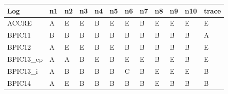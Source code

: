 \begin{tabular}{llllllllllll}
\toprule
        Log &                         n1 &                         n2 &                         n3 &                         n4 &                         n5 &                         n6 &                         n7 &                         n8 &                         n9 &                        n10 &                      trace \\
\midrule
      ACCRE & \cellcolor[HTML]{FFFFFF} A & \cellcolor[HTML]{56B4E9} E & \cellcolor[HTML]{56B4E9} E & \cellcolor[HTML]{D55E00} B & \cellcolor[HTML]{56B4E9} E & \cellcolor[HTML]{56B4E9} E & \cellcolor[HTML]{D55E00} B & \cellcolor[HTML]{56B4E9} E & \cellcolor[HTML]{56B4E9} E & \cellcolor[HTML]{56B4E9} E & \cellcolor[HTML]{56B4E9} E \\
     BPIC11 & \cellcolor[HTML]{D55E00} B & \cellcolor[HTML]{D55E00} B & \cellcolor[HTML]{D55E00} B & \cellcolor[HTML]{D55E00} B & \cellcolor[HTML]{D55E00} B & \cellcolor[HTML]{D55E00} B & \cellcolor[HTML]{D55E00} B & \cellcolor[HTML]{D55E00} B & \cellcolor[HTML]{D55E00} B & \cellcolor[HTML]{D55E00} B & \cellcolor[HTML]{FFFFFF} A \\
     BPIC12 & \cellcolor[HTML]{FFFFFF} A & \cellcolor[HTML]{56B4E9} E & \cellcolor[HTML]{56B4E9} E & \cellcolor[HTML]{D55E00} B & \cellcolor[HTML]{56B4E9} E & \cellcolor[HTML]{D55E00} B & \cellcolor[HTML]{D55E00} B & \cellcolor[HTML]{D55E00} B & \cellcolor[HTML]{D55E00} B & \cellcolor[HTML]{D55E00} B & \cellcolor[HTML]{56B4E9} E \\
 BPIC13\_cp & \cellcolor[HTML]{FFFFFF} A & \cellcolor[HTML]{FFFFFF} A & \cellcolor[HTML]{D55E00} B & \cellcolor[HTML]{56B4E9} E & \cellcolor[HTML]{D55E00} B & \cellcolor[HTML]{56B4E9} E & \cellcolor[HTML]{56B4E9} E & \cellcolor[HTML]{D55E00} B & \cellcolor[HTML]{56B4E9} E & \cellcolor[HTML]{D55E00} B & \cellcolor[HTML]{56B4E9} E \\
  BPIC13\_i & \cellcolor[HTML]{FFFFFF} A & \cellcolor[HTML]{D55E00} B & \cellcolor[HTML]{D55E00} B & \cellcolor[HTML]{D55E00} B & \cellcolor[HTML]{D55E00} B & \cellcolor[HTML]{E69F00} C & \cellcolor[HTML]{D55E00} B & \cellcolor[HTML]{56B4E9} E & \cellcolor[HTML]{56B4E9} E & \cellcolor[HTML]{56B4E9} E & \cellcolor[HTML]{D55E00} B \\
     BPIC14 & \cellcolor[HTML]{FFFFFF} A & \cellcolor[HTML]{56B4E9} E & \cellcolor[HTML]{D55E00} B & \cellcolor[HTML]{D55E00} B & \cellcolor[HTML]{D55E00} B & \cellcolor[HTML]{D55E00} B & \cellcolor[HTML]{D55E00} B & \cellcolor[HTML]{56B4E9} E & \cellcolor[HTML]{D55E00} B & \cellcolor[HTML]{D55E00} B & \cellcolor[HTML]{D55E00} B \\

\end{tabular}
